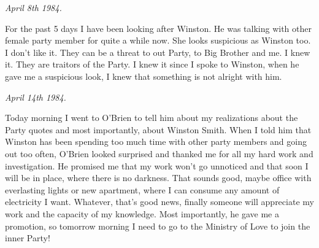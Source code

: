 \documentclass{article}
\begin{document}
\begin{flushleft}
  \textit{April 8th 1984.}
  \end{flushleft}

For the past 5 days I have been looking after Winston. He was talking with other female party member for quite a while now.  She looks suspicious as Winston too. I don't like it. They can be a threat to out Party, to Big Brother and me. I knew it. They are traitors of the Party. I knew it since I spoke to Winston, when he gave me a suspicious look, I knew that something is not alright with him.\\

\begin{flushleft}
  \textit{April 14th 1984.}
  \end{flushleft}

Today morning I went to O'Brien to tell him about my realizations about the Party quotes and most importantly, about Winston Smith. When I told him that Winston has been spending too much time with other party members and going out too often, O'Brien looked surprised and thanked me for all my hard work and investigation. He promised me that my work won't go unnoticed and that soon I will be in place, where there is no darkness. That sounds good, maybe office with everlasting lights or new apartment, where I can consume any amount of electricity I want. Whatever, that's good news, finally someone will appreciate my work and the capacity of my knowledge. Most importantly, he gave me a promotion, so tomorrow morning I need to go to the Ministry of Love to join the inner Party!  \\

  
\end{document}
